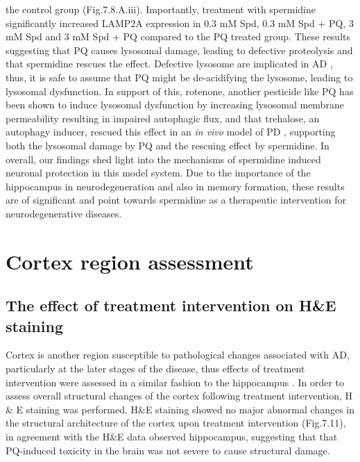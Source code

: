 the control group (Fig.7.8.A.iii). Importantly, treatment with spermidine significantly increased LAMP2A expression in 0.3 mM Spd, 0.3 mM Spd + PQ, 3 mM Spd and 3 mM Spd + PQ compared to the PQ treated group. These results suggesting that PQ causes lysosomal damage, leading to defective proteolysis and that spermidine rescues the effect. Defective lysosome are implicated in AD \citep{Nixon2011}, thus, it is safe to assume that PQ might be de-acidifying the lysosome, leading to lysosomal dysfunction. In support of this, rotenone, another pesticide like PQ has been shown to induce lysosomal dysfunction by increasing lysosomal membrane permeability resulting in impaired autophagic flux, and that trehalose, an autophagy inducer, rescued this effect in an \textit{in vivo} model of PD \citep{Wu2015}, supporting both the lysosomal damage by PQ and the rescuing effect by spermidine. In overall, our findings shed light into the mechanisms of spermidine induced neuronal protection in this model system. Due to the importance of the hippocampus in neurodegeneration and also in memory formation, these results are of significant and point towards spermidine as a therapeutic intervention for neurodegenerative diseases.


\section{Cortex region assessment}
\subsection{The effect of treatment intervention on H\&E staining}
Cortex is another region susceptible to pathological changes associated with AD, particularly at the later stages of the disease, thus effects of treatment intervention were assessed in a similar fashion to the hippocampus \citep{Braak1998,Braak1991,Braak2012}. In order to assess overall structural changes of the cortex following treatment intervention, H \& E staining was performed. H\&E staining showed no major abnormal changes in the structural architecture of the cortex upon treatment intervention (Fig.7.11), in agreement with the H\&E data observed hippocampus, suggesting that that PQ-induced toxicity in the brain was not severe to cause structural damage. 

